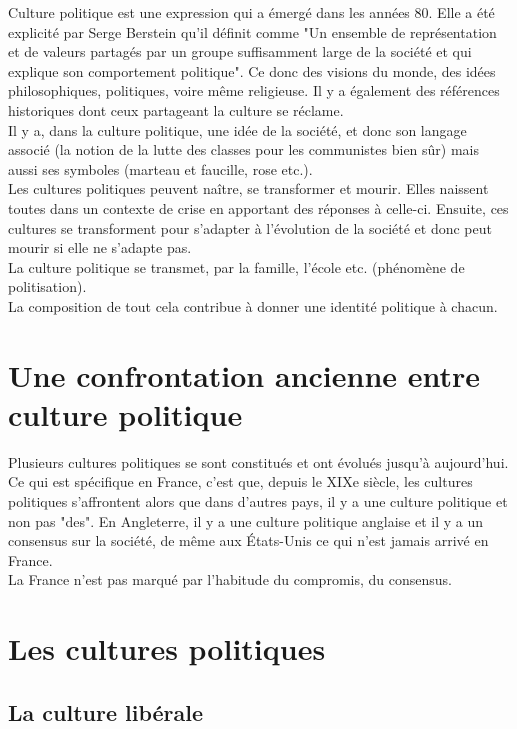\documentclass[12pt, a4paper, openany]{book}
\begin{document}
Culture politique est une expression qui a émergé dans les années 80. Elle a été explicité par Serge Berstein qu'il définit comme "Un ensemble de représentation et de valeurs partagés par un groupe suffisamment large de la société et qui explique son comportement politique". Ce donc des visions du monde, des idées philosophiques, politiques, voire même religieuse. Il y a également des références historiques dont ceux partageant la culture se réclame. \\
Il y a, dans la culture politique, une idée de la société, et donc son langage associé (la notion de la lutte des classes pour les communistes bien sûr) mais aussi ses symboles (marteau et faucille, rose etc.). \\
Les cultures politiques peuvent naître, se transformer et mourir. Elles naissent toutes dans un contexte de crise en apportant des réponses à celle-ci. Ensuite, ces cultures se transforment pour s'adapter à l'évolution de la société et donc peut mourir si elle ne s'adapte pas. \\
La culture politique se transmet, par la famille, l'école etc. (phénomène de politisation). \\
La composition de tout cela contribue à donner une identité politique à chacun.

\section{Une confrontation ancienne entre culture politique}

Plusieurs cultures politiques se sont constitués et ont évolués jusqu'à aujourd'hui. \\
Ce qui est spécifique en France, c'est que, depuis le XIXe siècle, les cultures politiques s'affrontent alors que dans d'autres pays, il y a une culture politique et non pas "des". En Angleterre, il y a une culture politique anglaise et il y a un consensus sur la société, de même aux États-Unis ce qui n'est jamais arrivé en France. \\
La France n'est pas marqué par l'habitude du compromis, du consensus.

\section{Les cultures politiques}

\subsection{La culture libérale}
\end{document}
